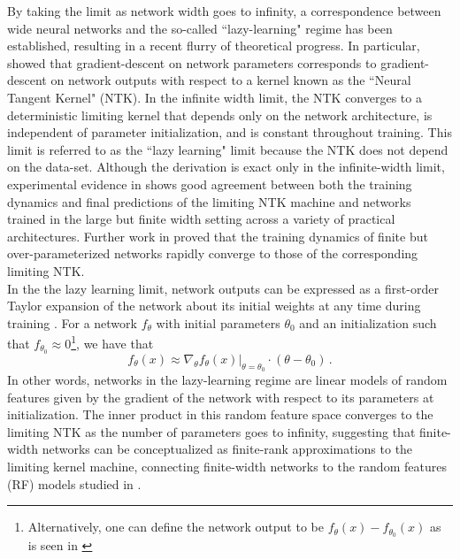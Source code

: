 \documentclass[a4paper, 11pt]{article}
\begin{document}
By taking the limit as network width goes to infinity, a correspondence between wide neural networks and the so-called ``lazy-learning" regime has been established, resulting in a recent flurry of theoretical progress. In particular, \cite{jacotNeuralTangentKernel2018} showed that gradient-descent on network parameters corresponds to gradient-descent on network outputs with respect to a kernel known as the ``Neural Tangent Kernel" (NTK). In the infinite width limit, the NTK converges to a deterministic limiting kernel that depends only on the network architecture, is independent of parameter initialization, and is constant throughout training. This limit is referred to as the ``lazy learning" limit because the NTK does not depend on the data-set. Although the derivation is exact only in the infinite-width limit, experimental evidence in \cite{jacotNeuralTangentKernel2018} shows good agreement between both the training dynamics and final predictions of the limiting NTK machine and networks trained in the large but finite width setting across a variety of practical architectures. Further work in \cite{allen-zhuConvergenceTheoryDeep2019} proved that the training dynamics of finite but over-parameterized networks rapidly converge to those of the corresponding limiting NTK.\\

In the the lazy learning limit, network outputs can be expressed as a first-order Taylor expansion of the network about its initial weights at any time during training \cite{leeWideNeuralNetworks2019}. For a network $f_\theta$ with initial parameters $\theta_0$ and an initialization such that $f_{\theta_0} \approx 0$\footnote{Alternatively, one can define the network output to be $f_{\theta}(x) - f_{\theta_0}(x)$ as is seen in \cite{chizatLazyTrainingDifferentiable2020}}, we have that
\begin{equation}
    f_\theta(x) \approx \nabla_\theta \left.f_\theta(x)\right|_{\theta=\theta_0} \cdot (\theta - \theta_0)\,.
\end{equation}
In other words, networks in the lazy-learning regime are linear models of random features given by the gradient of the network with respect to its parameters at initialization. The inner product in this random feature space converges to the limiting NTK as the number of parameters goes to infinity, suggesting that finite-width networks can be conceptualized as finite-rank approximations to the limiting kernel machine, connecting finite-width networks to the random features (RF) models studied in \cite{rahimiRandomFeaturesLargeScale2008,meiGeneralizationErrorRandom2019}.
\end{document}
